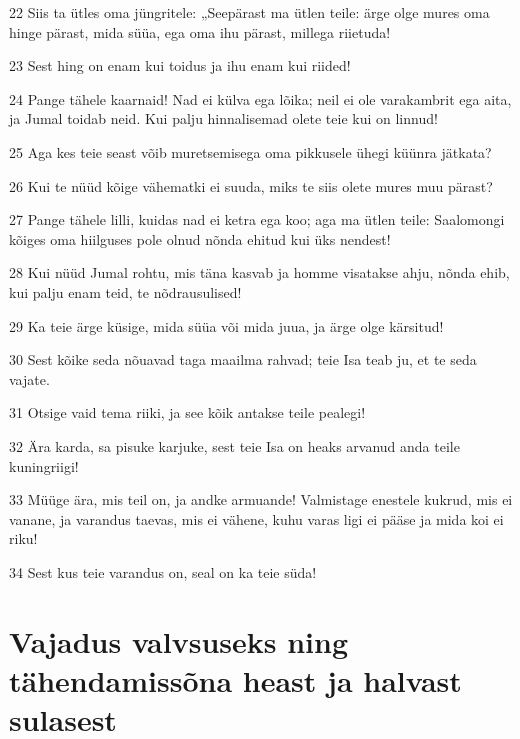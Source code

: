 \par 22 Siis ta ütles oma jüngritele: „Seepärast ma ütlen teile: ärge olge mures oma hinge pärast, mida süüa, ega oma ihu pärast, millega riietuda!
\par 23 Sest hing on enam kui toidus ja ihu enam kui riided!
\par 24 Pange tähele kaarnaid! Nad ei külva ega lõika; neil ei ole varakambrit ega aita, ja Jumal toidab neid. Kui palju hinnalisemad olete teie kui on linnud!
\par 25 Aga kes teie seast võib muretsemisega oma pikkusele ühegi küünra jätkata?
\par 26 Kui te nüüd kõige vähematki ei suuda, miks te siis olete mures muu pärast?
\par 27 Pange tähele lilli, kuidas nad ei ketra ega koo; aga ma ütlen teile: Saalomongi kõiges oma hiilguses pole olnud nõnda ehitud kui üks nendest!
\par 28 Kui nüüd Jumal rohtu, mis täna kasvab ja homme visatakse ahju, nõnda ehib, kui palju enam teid, te nõdrausulised!
\par 29 Ka teie ärge küsige, mida süüa või mida juua, ja ärge olge kärsitud!
\par 30 Sest kõike seda nõuavad taga maailma rahvad; teie Isa teab ju, et te seda vajate.
\par 31 Otsige vaid tema riiki, ja see kõik antakse teile pealegi!
\par 32 Ära karda, sa pisuke karjuke, sest teie Isa on heaks arvanud anda teile kuningriigi!
\par 33 Müüge ära, mis teil on, ja andke armuande! Valmistage enestele kukrud, mis ei vanane, ja varandus taevas, mis ei vähene, kuhu varas ligi ei pääse ja mida koi ei riku!
\par 34 Sest kus teie varandus on, seal on ka teie süda!

\section*{Vajadus valvsuseks ning tähendamissõna heast ja halvast sulasest}

